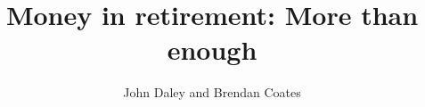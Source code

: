 \documentclass{grattan}
\author{John Daley and Brendan Coates}
\title{Money in retirement: More than enough}
\begin{document}



\contentspage
\listoffigures
\listoftables



















\printbibliography
\end{document}
